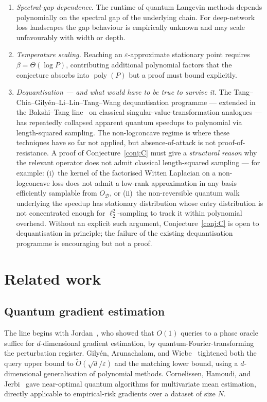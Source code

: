 \documentclass[11pt,a4paper]{article}
\theoremstyle{definition}
\DeclareMathOperator*{\poly}{poly}
\newcommand{\Otil}{\widetilde{O}}
\newcommand{\veps}{\varepsilon}
\newcommand{\Dset}{\mathcal{D}}
\begin{document}
\begin{enumerate}[label=(O\arabic*),itemsep=0pt,start=7]
\item \emph{Spectral-gap dependence.} The runtime of quantum Langevin methods depends polynomially on the spectral gap of the underlying chain. For deep-network loss landscapes the gap behaviour is empirically unknown and may scale unfavourably with width or depth.
\item \emph{Temperature scaling.} Reaching an $\veps$-approximate stationary point requires $\beta = \Theta(\log P)$, contributing additional polynomial factors that the conjecture absorbs into $\poly(P)$ but a proof must bound explicitly.
\item \emph{Dequantisation --- and what would have to be true to survive it.} The Tang--Chia--Gily\'{e}n--Li--Lin--Tang--Wang dequantisation programme \cite{Tang2019,ChiaEtAl2020} --- extended in the Bakshi--Tang line~\cite{BakshiTang2024} on classical singular-value-transformation analogues --- has repeatedly collapsed apparent quantum speedups to polynomial via length-squared sampling. The non-logconcave regime is where these techniques have so far not applied, but absence-of-attack is not proof-of-resistance. A proof of Conjecture~\ref{conj:C} must give a \emph{structural reason} why the relevant operator does not admit classical length-squared sampling --- for example: (i)~the kernel of the factorised Witten Laplacian on a non-logconcave loss does not admit a low-rank approximation in any basis efficiently samplable from $O_\Dset$, or (ii)~the non-reversible quantum walk underlying the speedup has stationary distribution whose entry distribution is not concentrated enough for $\ell_2^2$-sampling to track it within polynomial overhead. Without an explicit such argument, Conjecture~\ref{conj:C} is open to dequantisation in principle; the failure of the existing dequantisation programme is encouraging but not a proof.
\end{enumerate}

\section{Related work}\label{sec:related}

\subsection{Quantum gradient estimation}

The line begins with Jordan~\cite{Jordan2005}, who showed that $O(1)$ queries to a phase oracle suffice for $d$-dimensional gradient estimation, by quantum-Fourier-transforming the perturbation register. Gily\'{e}n, Arunachalam, and Wiebe~\cite{GAW2019} tightened both the query upper bound to $\Otil(\sqrt{d}/\veps)$ and the matching lower bound, using a $d$-dimensional generalisation of polynomial methods. Cornelissen, Hamoudi, and Jerbi~\cite{CornelissenHamoudiJerbi2022} gave near-optimal quantum algorithms for multivariate mean estimation, directly applicable to empirical-risk gradients over a dataset of size $N$.
\end{document}
